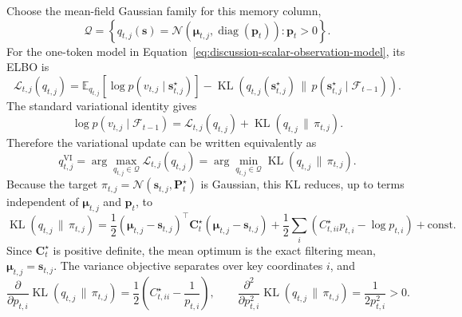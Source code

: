 \documentclass[11pt]{article}
\newcommand{\vct}[1]{\boldsymbol{#1}}
\newcommand{\diag}{\operatorname{diag}}
\begin{document}
Choose the mean-field Gaussian family for this memory column,
\begin{equation}
  \mathcal{Q}
  =\left\{
    q_{t,j}(\vct{s})
    =\mathcal{N}\!\left(\vct{\mu}_{t,j},\diag(\vct{p}_t)\right)
    :\vct{p}_t>0
  \right\}.
  \label{eq:discussion-mean-field-family}
\end{equation}
For the one-token model in Equation~\eqref{eq:discussion-scalar-observation-model}, its ELBO is
\begin{equation}
  \mathcal{L}_{t,j}(q_{t,j})
  =\mathbb{E}_{q_{t,j}}\!\left[
    \log p(v_{t,j}\mid\vct{s}_{t,j}^\star)
  \right]
  -\operatorname{KL}\!\left(
    q_{t,j}(\vct{s}_{t,j}^\star)\,\|\,
    p(\vct{s}_{t,j}^\star\mid\mathcal{F}_{t-1})
  \right).
  \label{eq:discussion-one-step-elbo}
\end{equation}
The standard variational identity gives
\begin{equation}
  \log p(v_{t,j}\mid\mathcal{F}_{t-1})
  =\mathcal{L}_{t,j}(q_{t,j})
  +\operatorname{KL}(q_{t,j}\,\|\,\pi_{t,j}).
  \label{eq:discussion-elbo-kl-identity}
\end{equation}
Therefore the variational update can be written equivalently as
\begin{equation}
  q_{t,j}^{\mathrm{VI}}
  =\arg\max_{q_{t,j}\in\mathcal{Q}}\mathcal{L}_{t,j}(q_{t,j})
  =\arg\min_{q_{t,j}\in\mathcal{Q}}
    \operatorname{KL}(q_{t,j}\,\|\,\pi_{t,j}).
  \label{eq:discussion-online-vi-objective}
\end{equation}
Because the target $\pi_{t,j}=\mathcal{N}(\vct{s}_{t,j},\vct{P}_t^\star)$ is Gaussian, this KL
reduces, up to terms independent of $\vct{\mu}_{t,j}$ and $\vct{p}_t$, to
\begin{equation}
  \operatorname{KL}(q_{t,j}\,\|\,\pi_{t,j})
  =\frac{1}{2}(\vct{\mu}_{t,j}-\vct{s}_{t,j})^\top\vct{C}_t^\star
    (\vct{\mu}_{t,j}-\vct{s}_{t,j})
  +\frac{1}{2}\sum_i
    \left(C_{t,ii}^\star p_{t,i}-\log p_{t,i}\right)
  +\mathrm{const}.
  \label{eq:discussion-reverse-kl-objective}
\end{equation}
Since $\vct{C}_t^\star$ is positive definite, the mean optimum is the exact filtering mean,
$\vct{\mu}_{t,j}=\vct{s}_{t,j}$. The variance objective separates over key coordinates $i$, and
\begin{equation}
  \frac{\partial}{\partial p_{t,i}}
  \operatorname{KL}(q_{t,j}\,\|\,\pi_{t,j})
  =\frac{1}{2}\left(C_{t,ii}^\star-\frac{1}{p_{t,i}}\right),
  \qquad
  \frac{\partial^2}{\partial p_{t,i}^2}
  \operatorname{KL}(q_{t,j}\,\|\,\pi_{t,j})
  =\frac{1}{2p_{t,i}^2}>0.
  \label{eq:discussion-reverse-kl-coordinate-derivative}
\end{equation}
\end{document}
